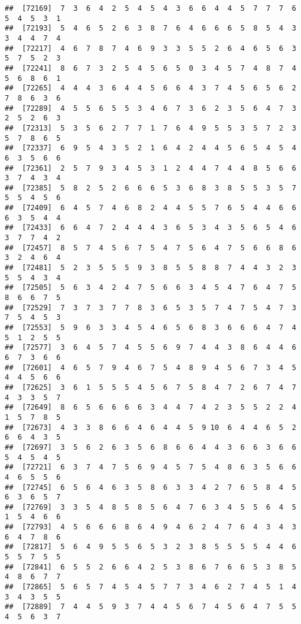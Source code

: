 \documentclass[
]{book}
\begin{document}
\begin{verbatim}
##  [72169]  7  3  6  4  2  5  4  5  4  3  6  6  4  4  5  7  7  7  6  5  4  5  3  1
##  [72193]  5  4  6  5  2  6  3  8  7  6  4  6  6  6  5  8  5  4  3  3  4  4  7  4
##  [72217]  4  6  7  8  7  4  6  9  3  3  5  5  2  6  4  6  5  6  3  5  7  5  2  3
##  [72241]  8  6  7  3  2  5  4  5  6  5  0  3  4  5  7  4  8  7  4  5  6  8  6  1
##  [72265]  4  4  4  3  6  4  4  5  6  6  4  3  7  4  5  6  5  6  2  7  8  6  3  6
##  [72289]  4  5  5  6  5  5  3  4  6  7  3  6  2  3  5  6  4  7  3  2  5  2  6  3
##  [72313]  5  3  5  6  2  7  7  1  7  6  4  9  5  5  3  5  7  2  3  5  7  8  6  5
##  [72337]  6  9  5  4  3  5  2  1  6  4  2  4  4  5  6  5  4  5  4  6  3  5  6  6
##  [72361]  2  5  7  9  3  4  5  3  1  2  4  4  7  4  4  8  5  6  6  3  7  4  3  4
##  [72385]  5  8  2  5  2  6  6  6  5  3  6  8  3  8  5  5  3  5  7  5  5  4  5  6
##  [72409]  6  4  5  7  4  6  8  2  4  4  5  5  7  6  5  4  4  6  6  6  3  5  4  4
##  [72433]  6  6  4  7  2  4  4  4  3  6  5  3  4  3  5  6  5  4  6  3  7  7  4  2
##  [72457]  8  5  7  4  5  6  7  5  4  7  5  6  4  7  5  6  6  8  6  3  2  4  6  4
##  [72481]  5  2  3  5  5  5  9  3  8  5  5  8  8  7  4  4  3  2  3  5  5  4  3  4
##  [72505]  5  6  3  4  2  4  7  5  6  6  3  4  5  4  7  6  4  7  5  8  6  6  7  5
##  [72529]  7  3  7  3  7  7  8  3  6  5  3  5  7  4  7  5  4  7  3  7  5  4  5  3
##  [72553]  5  9  6  3  3  4  5  4  6  5  6  8  3  6  6  6  4  7  4  5  1  2  5  5
##  [72577]  3  6  4  5  7  4  5  5  6  9  7  4  4  3  8  6  4  4  6  6  7  3  6  6
##  [72601]  4  6  5  7  9  4  6  7  5  4  8  9  4  5  6  7  3  4  5  4  4  5  6  6
##  [72625]  3  6  1  5  5  5  4  5  6  7  5  8  4  7  2  6  7  4  7  4  3  3  5  7
##  [72649]  8  6  5  6  6  6  6  3  4  4  7  4  2  3  5  5  2  2  4  1  5  7  8  5
##  [72673]  4  3  3  8  6  6  4  6  4  4  5  9 10  6  4  4  6  5  2  6  6  4  3  5
##  [72697]  3  5  6  2  6  3  5  6  8  6  6  4  4  3  6  6  3  6  6  5  4  5  4  5
##  [72721]  6  3  7  4  7  5  6  9  4  5  7  5  4  8  6  3  5  6  6  4  6  5  5  6
##  [72745]  6  5  6  4  6  3  5  8  6  3  3  4  2  7  6  5  8  4  5  6  3  6  5  7
##  [72769]  3  3  5  4  8  5  8  5  6  4  7  6  3  4  5  5  6  4  5  1  5  4  6  6
##  [72793]  4  5  6  6  6  8  6  4  9  4  6  2  4  7  6  4  3  4  3  6  4  7  8  6
##  [72817]  5  6  4  9  5  5  6  5  3  2  3  8  5  5  5  5  4  4  6  5  5  7  5  5
##  [72841]  6  5  5  2  6  6  4  2  5  3  8  6  7  6  6  5  3  8  5  4  8  6  7  7
##  [72865]  5  6  5  7  4  5  4  5  7  7  3  4  6  2  7  4  5  1  4  3  4  3  5  5
##  [72889]  7  4  4  5  9  3  7  4  4  5  6  7  4  5  6  4  7  5  5  4  5  6  3  7

\end{verbatim}
\end{document}
